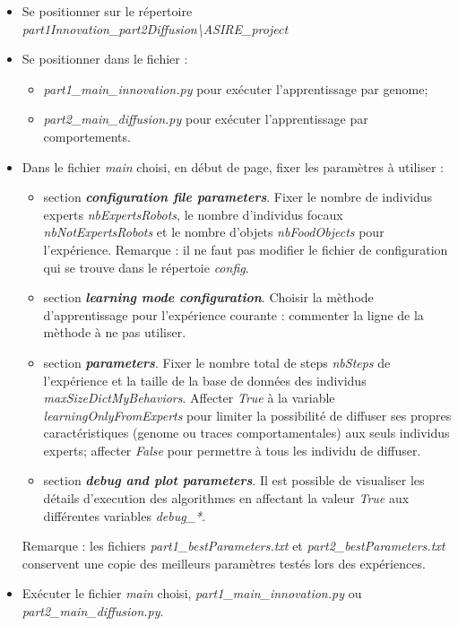 \documentclass[a4paper, 12pt]{report}
\begin{document}
    \begin{itemize}
        \item Se positionner sur le répertoire \textit{part1Innovation\_part2Diffusion\textbackslash ASIRE\_project}
        
        \item Se positionner dans le fichier :
        
        \begin{itemize}
        \item \textit{part1\_main\_innovation.py} pour exécuter l'apprentissage par genome;
        \item \textit{part2\_main\_diffusion.py} pour exécuter l'apprentissage par comportements.
        \end{itemize}
        
        \item Dans le fichier \textit{main} choisi, en début de page, fixer les paramètres à utiliser :
        
        \begin{itemize}
        \item section \textbf{\textit{configuration file parameters}}. Fixer le nombre de individus experts \textit{nbExpertsRobots}, le nombre d'individus focaux \textit{nbNotExpertsRobots} et le nombre d'objets \textit{nbFoodObjects} pour l'expérience. Remarque : il ne faut pas modifier le fichier de configuration qui se trouve dans le répertoie \textit{config}.
        \item section \textbf{\textit{learning mode configuration}}. Choisir la mèthode d'apprentissage pour l'expérience courante : commenter la ligne de la mèthode à ne pas utiliser.
        \item section \textbf{\textit{parameters}}. Fixer le nombre total de steps \textit{nbSteps} de l'expérience et la taille de la base de données des individus \textit{maxSizeDictMyBehaviors}. Affecter \textit{True} à la variable \textit{learningOnlyFromExperts} pour limiter la possibilité de diffuser ses propres caractéristiques (genome ou traces comportamentales) aux seuls individus experts; affecter \textit{False} pour permettre à tous les individu de diffuser.
        \item section \textbf{\textit{debug and plot parameters}}. Il est possible de visualiser les détails d'execution des algorithmes en affectant la valeur \textit{True} aux différentes variables \textit{debug\_*}.
        \end{itemize}
        
        Remarque : les fichiers \textit{part1\_bestParameters.txt} et \textit{part2\_bestParameters.txt} conservent une copie des meilleurs paramètres testés lors des expériences.
        
        \item Exécuter le fichier \textit{main} choisi, \textit{part1\_main\_innovation.py} ou \textit{part2\_main\_diffusion.py}.
    
    \end{itemize}
    
\end{document}
